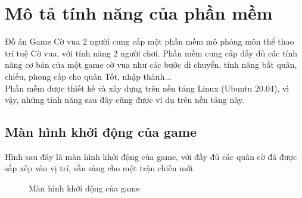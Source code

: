 \section{Mô tả tính năng của phần mềm}
Đồ án Game Cờ vua 2 người cung cấp một phần mềm mô phỏng môn thể thao trí tuệ Cờ vua, với tính năng 2 người chơi. Phần mềm cung cấp đầy đủ các tính năng cơ bản của một game cờ vua như các bước di chuyển, tính năng bắt quân, chiếu, phong cấp cho quân Tốt, nhập thành...\\
Phần mềm được thiết kế và xây dựng trên nền tảng Linux (Ubuntu 20.04), vì vậy, những tính năng sau đây cũng được ví dụ trên nền tảng này.

\subsection{Màn hình khởi động của game}
Hình sau đây là màn hình khởi động của game, với đầy đủ các quân cờ đã được sắp xếp vào vị trí, sẵn sàng cho một trận chiến mới.
\begin{figure}[H]
\caption{Màn hình khởi động của game}
\end{figure}

